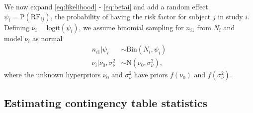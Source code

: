 \documentclass[AMA,STIX1COL]{WileyNJD-v2}
\newcommand{\RF}{\mbox{RF}}
\begin{document}
We now expand \eqref{eq:likelihood} - \eqref{eq:betai} and add a random effect $\psi_i = \mbox{P}(\RF_{ij})$, the probability of having the risk factor for subject $j$ in study $i$. Defining $\nu_i = \mbox{logit}(\psi_i)$, we assume binomial sampling for $n_{i1}$ from $N_i$ and model $\nu_i$ as normal
\begin{align}
n_{i1} \vert \psi_i &\sim \mbox{Bin}(N_i, \psi_i) \label{eq:nij} \\
\nu_i \vert \nu_0, \sigma^2_\nu & \sim \mbox{N}(\nu_0, \sigma^2_\nu), \label{eq:nui}
\end{align}
\noindent where the unknown hyperpriors $\nu_0$ and $\sigma^2_\nu$ have priors $f(\nu_0)$ and $f(\sigma^2_{\nu})$. 

\subsection{Estimating contingency table statistics} \label{sec:CTSs}
\end{document}
